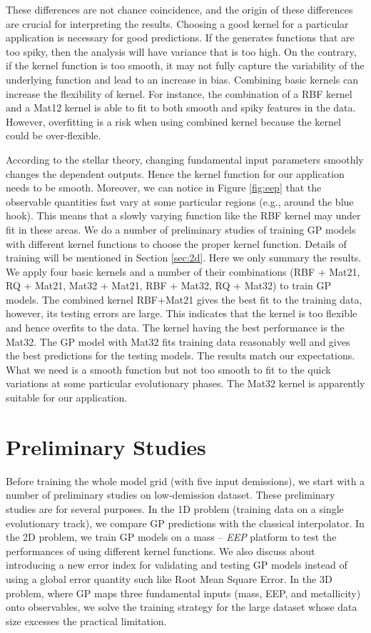 %
These differences are not chance coincidence, and the origin of these differences are crucial for interpreting the results. Choosing a good kernel for a particular application is necessary for good predictions. If the generates functions that are too spiky, then the analysis will have variance that is too high. On the contrary, if the kernel function is too smooth, it may not fully capture the variability of the underlying function and lead to an increase in bias.
%
Combining basic kernels can increase the flexibility of kernel. For instance, the combination of a RBF kernel and a Mat12 kernel is able to fit to both smooth and spiky features in the data. However,  overfitting is a risk when using combined kernel because the kernel could be over-flexible.

According to the stellar theory, changing fundamental input parameters smoothly changes the dependent outputs. Hence the kernel function for our application needs to be smooth. Moreover, we can notice in Figure \ref{fig:eep} that the observable quantities fast vary at some particular regions (e.g., around the blue hook). This means that a slowly varying function like the RBF kernel may under fit in these areas. We do a number of preliminary studies of training GP models with different kernel functions to choose the proper kernel function. Details of training will be mentioned in Section \ref{sec:2d}. Here we only summary the results. 
%
We apply four basic kernels and a number of their combinations (RBF + Mat21, RQ + Mat21, Mat32 + Mat21, RBF + Mat32, RQ + Mat32) to train GP models. The combined kernel RBF+Mat21 gives the best fit to the training data, however, its testing errors are large. This indicates that the kernel is too flexible and hence overfits to the data.  
%
The kernel having the best performance is the Mat32. The GP model with Mat32 fits training data reasonably well and gives the best predictions for the testing models. 
%
The results match our expectations. What we need is a smooth function but not too smooth to fit to the quick variations at some particular evolutionary phases. The Mat32 kernel is apparently suitable for our application. 

\section{Preliminary Studies}\label{examples}

Before training the whole model grid (with five input demissions), we start with a number of preliminary studies on low-demission dataset. 
%
These preliminary studies are for several purposes. In the 1D problem (training data on a single evolutionary track), we compare GP predictions with the classical interpolator. In the 2D problem, we train GP models on a mass -- {\it EEP} platform to test the performances of using different kernel functions. We also discuss about introducing a new error index for validating and testing GP models instead of using a global error quantity such like Root Mean Square Error.
%
In the 3D problem, where GP maps three fundamental inputs (mass, EEP, and metallicity) onto observables, we solve the training strategy for the large dataset whose data size excesses the practical limitation. 

